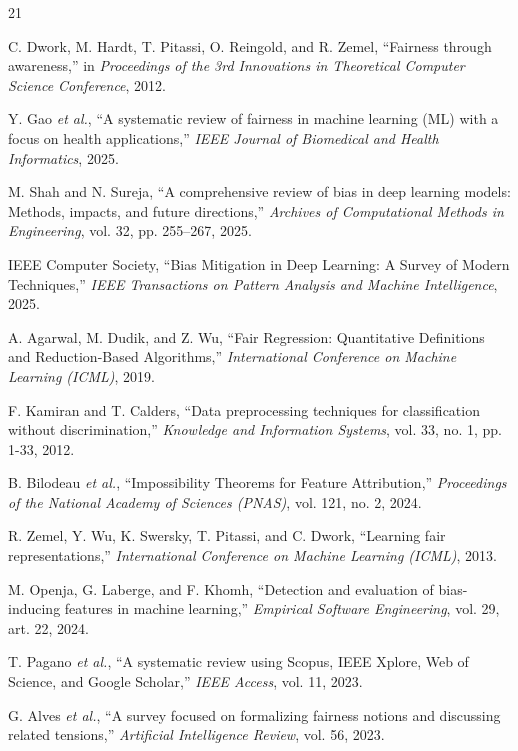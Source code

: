 \documentclass[conference]{IEEEtran}
\begin{document}
\begin{thebibliography}{21}

C. Dwork, M. Hardt, T. Pitassi, O. Reingold, and R. Zemel, ``Fairness through awareness,'' in \textit{Proceedings of the 3rd Innovations in Theoretical Computer Science Conference}, 2012.

Y. Gao \textit{et al.}, ``A systematic review of fairness in machine learning (ML) with a focus on health applications,'' \textit{IEEE Journal of Biomedical and Health Informatics}, 2025.

M. Shah and N. Sureja, 
``A comprehensive review of bias in deep learning models: Methods, impacts, and future directions,'' 
\textit{Archives of Computational Methods in Engineering}, vol. 32, pp. 255--267, 2025.

IEEE Computer Society, 
``Bias Mitigation in Deep Learning: A Survey of Modern Techniques,'' 
\textit{IEEE Transactions on Pattern Analysis and Machine Intelligence}, 2025.

A. Agarwal, M. Dudik, and Z. Wu, 
``Fair Regression: Quantitative Definitions and Reduction-Based Algorithms,'' 
\textit{International Conference on Machine Learning (ICML)}, 2019.

F. Kamiran and T. Calders, 
``Data preprocessing techniques for classification without discrimination,'' 
\textit{Knowledge and Information Systems}, vol. 33, no. 1, pp. 1-33, 2012.

B. Bilodeau \textit{et al.}, 
``Impossibility Theorems for Feature Attribution,'' 
\textit{Proceedings of the National Academy of Sciences (PNAS)}, vol. 121, no. 2, 2024.

R. Zemel, Y. Wu, K. Swersky, T. Pitassi, and C. Dwork, 
``Learning fair representations,'' 
\textit{International Conference on Machine Learning (ICML)}, 2013.

M. Openja, G. Laberge, and F. Khomh, 
``Detection and evaluation of bias-inducing features in machine learning,'' 
\textit{Empirical Software Engineering}, vol. 29, art. 22, 2024.

T. Pagano \textit{et al.}, 
``A systematic review using Scopus, IEEE Xplore, Web of Science, and Google Scholar,'' 
\textit{IEEE Access}, vol. 11, 2023.

G. Alves \textit{et al.}, 
``A survey focused on formalizing fairness notions and discussing related tensions,'' 
\textit{Artificial Intelligence Review}, vol. 56, 2023.


\end{thebibliography}
\end{document}
